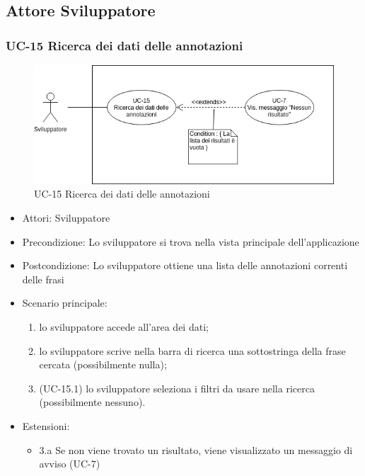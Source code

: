 \subsection{Attore Sviluppatore}

	\subsubsection{UC-15 Ricerca dei dati delle annotazioni}
		\begin{figure}[h]
			\centering
			\includegraphics[scale=0.7]{images/UC-15.png}
			\caption{UC-15 Ricerca dei dati delle annotazioni}
		\end{figure}			
	
		\begin{itemize}
			\item Attori: Sviluppatore
			\item Precondizione: Lo sviluppatore si trova nella vista principale dell'applicazione
			\item Postcondizione: Lo sviluppatore ottiene una lista delle annotazioni correnti delle frasi
			\item Scenario principale:
				\begin{enumerate}
					\item lo sviluppatore accede all'area dei dati;
					\item lo sviluppatore scrive nella barra di ricerca una sottostringa della frase cercata (possibilmente nulla);
					\item (UC-15.1) lo sviluppatore seleziona i filtri da usare nella ricerca (possibilmente nessuno).
				\end{enumerate}
			\item Estensioni:
				\begin{itemize}
					\item 3.a Se non viene trovato un risultato, viene visualizzato un messaggio di avviso (UC-7)
				\end{itemize}
		\end{itemize}


